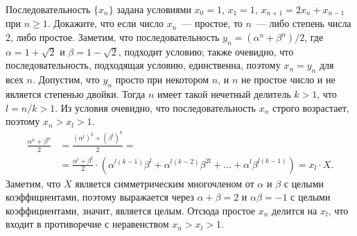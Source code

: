 \problem
Последовательность $\{ x_n \}$ задана условиями
$x_0 = 1$, $x_1 = 1$, $x_{n + 1} = 2 x_{n} + x_{n - 1}$ при $n \geq 1$.
Докажите, что если число $x_n$~--- простое, то $n$~--- либо степень числа 2,
либо простое.
\solution
Заметим, что последовательность
$y_n = (\alpha^n + \beta^n)/2$,
где $\alpha = 1 + \sqrt{2}$ и $\beta = 1 - \sqrt{2}$,
подходит условию;
также очевидно, что последовательность, подходящая условию, единственна,
поэтому $x_n = y_n$ для всех $n$.
Допустим, что $y_n$ просто при некотором $n$, и $n$ не простое число и не
является степенью двойки.
Тогда $n$ имеет такой нечетный делитель $k > 1$, что $l = n / k > 1$.
Из условия очевидно, что последовательность $x_n$ строго возрастает, поэтому
$x_n > x_l > 1$.
\begin{align*}
    \frac{\alpha^n + \beta^n}{2}
&{}=
    \frac{(\alpha^l)^k + (\beta^l)^k}{2}
=\\&{}=
    \frac{\alpha^l + \beta^l}{2}
    \cdot
    \left(
        \alpha^{l (k - 1)} \beta^l
        +
        \alpha^{l (k - 2)} \beta^{2 l}
        + \ldots +
        \alpha^l \beta^{l (k - 1)}
    \right)
=
    x_l \cdot X
.\end{align*}
Заметим, что $X$ является симметрическим многочленом от $\alpha$ и $\beta$ с
целыми коэффициентами,
поэтому выражается через $\alpha + \beta = 2$ и $\alpha \beta = -1$
с целыми коэффициентами, значит, является целым.
Отсюда простое $x_n$ делится на $x_l$, что входит в противоречие с
неравенством $x_n > x_l > 1$.
\endproblem

